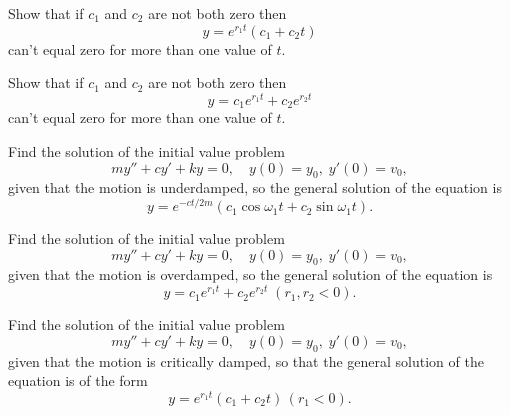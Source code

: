 \begin{exerciselist}
  \item\label{exer:6.2.22} Show that if $c_{1}$ and $c_{2}$ are not both zero then
  \[
    y=e^{r_{1}t}(c_{1}+c_{2}t)
  \]
  can't equal zero for more than one value of $t$.

  \item\label{exer:6.2.23} Show that if $c_{1}$ and $c_{2}$ are not both zero then
  \[
    y=c_{1}e^{r_{1}t}+c_{2}e^{r_{2}t}
  \]
  can't equal zero for more than one value of $t$.

  \item\label{exer:6.2.24} Find the solution of the initial value problem
  \[
    my''+cy'+ky=0,\quad y(0)=y_{0},\;y'(0)=v_{0},
  \]
  given that the motion is underdamped, so the general solution of the equation is
  \[
    y=e^{-ct/2m}(c_{1}\cos\omega_{1}t+c_{2}\sin\omega_{1}t).
  \]

  \item\label{exer:6.2.25} Find the solution of the initial value problem
  \[
    my''+cy'+ky=0,\quad y(0)=y_{0},\;y'(0)=v_{0},
  \]
  given that the motion is overdamped, so the general solution of the equation is
  \[
    y=c_{1}e^{r_{1}t}+c_{2}e^{r_{2}t}\;(r_{1},r_{2}<0).
  \]

  \item\label{exer:6.2.26} Find the solution of the initial value problem
  \[
    my''+cy'+ky=0,\quad y(0)=y_{0},\;y'(0)=v_{0},
  \]
  given that the motion is critically damped, so that the general solution of the equation is of the
  form
  \[
    y=e^{r_{1}t}(c_{1}+c_{2}t)\,(r_{1}<0).
  \]
\end{exerciselist}
